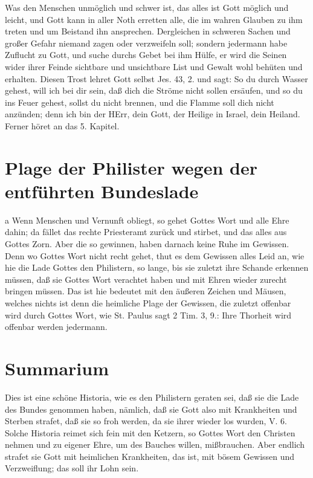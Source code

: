 Was den Menschen unmöglich und schwer ist, das alles ist Gott möglich und leicht, und Gott kann in aller Noth erretten alle, die im wahren Glauben zu ihm treten und um Beistand ihn ansprechen. Dergleichen in schweren Sachen und großer Gefahr niemand zagen oder verzweifeln soll; sondern jedermann habe Zuflucht zu Gott, und suche durchs Gebet bei ihm Hülfe, er wird die Seinen wider ihrer Feinde sichtbare und unsichtbare List und Gewalt wohl behüten und erhalten. Diesen Trost lehret Gott selbst Jes. 43, 2. und sagt: So du durch Wasser gehest, will ich bei dir sein, daß dich die Ströme nicht sollen ersäufen, und so du ins Feuer gehest, sollst du nicht brennen, und die Flamme soll dich nicht anzünden; denn ich bin der HErr, dein Gott, der Heilige in Israel, dein Heiland. Ferner höret an das 5. Kapitel.

\section{Plage der Philister wegen der entführten Bundeslade}

a Wenn Menschen und Vernunft obliegt, so gehet Gottes Wort und alle Ehre dahin; da fället das rechte Priesteramt zurück und stirbet, und das alles aus Gottes Zorn. Aber die so gewinnen, haben darnach keine Ruhe im Gewissen. Denn wo Gottes Wort nicht recht gehet, thut es dem Gewissen alles Leid an, wie hie die Lade Gottes den Philistern, so lange, bis sie zuletzt ihre Schande erkennen müssen, daß sie Gottes Wort verachtet haben und mit Ehren wieder zurecht bringen müssen. Das ist hie bedeutet mit den äußeren Zeichen und Mäusen, welches nichts ist denn die heimliche Plage der Gewissen, die zuletzt offenbar wird durch Gottes Wort, wie St. Paulus sagt 2 Tim. 3, 9.: Ihre Thorheit wird offenbar werden jedermann.

\section{Summarium}

Dies ist eine schöne Historia, wie es den Philistern geraten sei, daß sie die Lade des Bundes genommen haben, nämlich, daß sie Gott also mit Krankheiten und Sterben strafet, daß sie so froh werden, da sie ihrer wieder los wurden, V. 6. Solche Historia reimet sich fein mit den Ketzern, so Gottes Wort den Christen nehmen und zu eigener Ehre, um des Bauches willen, mißbrauchen. Aber endlich strafet sie Gott mit heimlichen Krankheiten, das ist, mit bösem Gewissen und Verzweiflung; das soll ihr Lohn sein.

